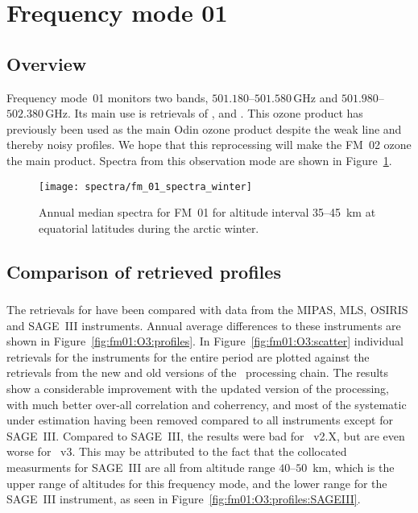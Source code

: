 \section{Frequency mode 01}
\label{sec:fm01}

\subsection{Overview}
\label{sec:fm01:overview}
Frequency mode~01 monitors two bands, $501.180$--$501.580\,\mathrm{GHz}$ and
$501.980$--$502.380\,\mathrm{GHz}$. Its main use is retrievals of ,
 and . This ozone product has previously been used as
the main Odin ozone product despite the weak line and thereby noisy profiles.
We hope that this reprocessing will make the FM~02 ozone the main product.
Spectra from this observation mode are shown in Figure~\ref{fig:spectra:01}.

\begin{figure}[ht]
    \centering
    \texttt{[image: spectra/fm\_01\_spectra\_winter]}
    \caption{Annual median spectra for FM~01 for altitude interval 35--45~km at
        equatorial latitudes during the arctic winter.
    }\label{fig:spectra:01}
\end{figure}


\subsection{Comparison of retrieved profiles}
\label{sec:fm01:comparison}



\subsubsection{}
\label{sec:fm01:comparison:O3}
The retrievals for  have been compared with data from the MIPAS, MLS,
OSIRIS and SAGE~III instruments. Annual average differences to these
instruments are shown in Figure~\ref{fig:fm01:O3:profiles}. In
Figure~\ref{fig:fm01:O3:scatter} individual retrievals for the instruments for
the entire period are plotted against the retrievals from the new and old
versions of the \smr\ processing chain. The results show a considerable
improvement with the updated version of the processing, with much better
over-all correlation and coherrency, and most of the systematic under
estimation having been removed compared to all instruments except for SAGE~III.
Compared to SAGE~III, the results were bad for \smr~v2.X, but are even worse
for \smr~v3. This may be attributed to the fact that the collocated measurments
for SAGE~III are all from altitude range $40$--$50$~km, which is the upper
range of altitudes for this frequency mode, and the lower range for the
SAGE~III instrument, as seen in Figure~\ref{fig:fm01:O3:profiles:SAGEIII}.

